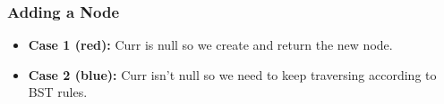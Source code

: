 \documentclass{beamer}
\begin{document}
\begin{frame}
	\frametitle{Adding a Node}
    \begin{minipage}{0.49\textwidth}
    \begin{algorithm}[H]
        \DontPrintSemicolon
        \tiny
    \end{algorithm}
    \begin{algorithm}[H]
        \DontPrintSemicolon
        \tiny
    \end{algorithm}
    \end{minipage}
    \hfill
    \begin{minipage}{0.49\textwidth}
        \begin{itemize}
            \item \textbf{Case 1 (red): } Curr is null so we create and return the new node.
            \item \textbf{Case 2 (blue): } Curr isn't null so we need to keep traversing according to BST rules.
        \end{itemize}
    \end{minipage}
\end{frame}
\end{document}
